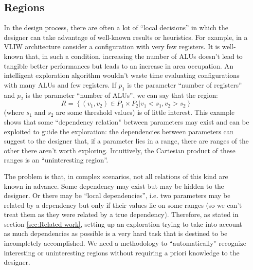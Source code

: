 \subsection{Regions}

In the design process, there are often a lot of ``local decisions''
in which the designer can take advantage of well-known results or
heuristics. For example, in a VLIW architecture consider a configuration
with very few registers. It is well-known that, in such a condition,
increasing the number of ALUs doesn't lead to tangible better performances
but leads to an increase in area occupation. An intelligent exploration
algorithm wouldn't waste time evaluating configurations with many
ALUs and few registers. If $p_{1}$ is the parameter ``number of
registers'' and $p_{2}$ is the parameter ``number of ALUs'', we
can say that the region:
\[
R=\left\{ \left.\left(v_{1},v_{2}\right)\in P_{1}\times P_{2}\right|v_{1}<s_{1},v_{2}>s_{2}\right\} 
\]
 (where $s_{1}$ and $s_{2}$ are some threshold values) is of little
interest. This example shows that some ``dependency relation'' between
parameters may exist and can be exploited to guide the exploration:
the dependencies between parameters can suggest to the designer that,
if a parameter lies in a range, there are ranges of the other there
aren't worth exploring. Intuitively, the Cartesian product of these
ranges is an ``uninteresting region''.

The problem is that, in complex scenarios, not all relations of this
kind are known in advance. Some dependency may exist but may be hidden
to the designer. Or there may be ``local dependencies'', i.e. two
parameters may be related by a dependency but only if their values
lie on some ranges (so we can't treat them as they were related by
a true dependency). Therefore, as stated in section \ref{sec:Related-work},
setting up an exploration trying to take into account as much dependencies
as possible is a very hard task that is destined to be incompletely
accomplished. We need a methodology to ``automatically'' recognize
interesting or uninteresting regions without requiring a priori knowledge
to the designer.

